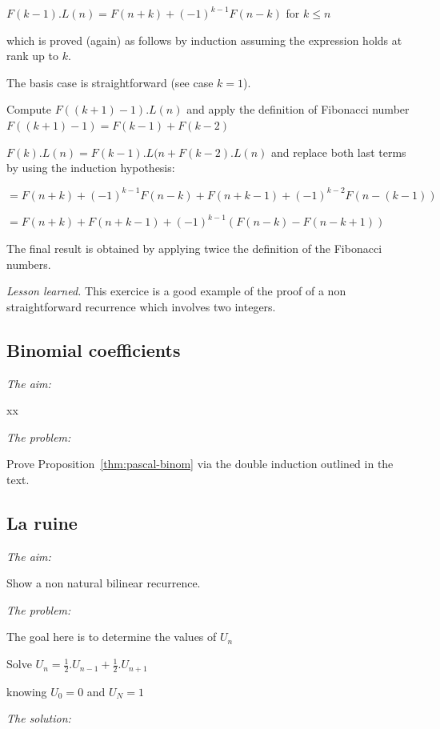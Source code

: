 \begin{itemize}
$F(k-1).L(n) = F(n+k) + (-1)^{k-1}F(n-k)$ for $k \leq n$
\medskip

which is proved (again) as follows by induction assuming the expression holds at rank up to $k$.

The basis case is straightforward (see case $k=1$).

Compute $F((k+1)-1).L(n)$ and apply the definition of Fibonacci number $F((k+1)-1) = F(k-1) + F(k-2)$

$F(k).L(n) = F(k-1).L(n + F(k-2).L(n)$ and replace both last terms by using the induction hypothesis:

$= F(n+k) + (-1)^{k-1}F(n-k) + F(n+k-1) + (-1)^{k-2}F(n-(k-1))$

$= F(n+k) +  F(n+k-1) + (-1)^{k-1}(F(n-k) - F(n-k+1))$

The final result is obtained by applying twice the definition of the Fibonacci numbers.
\medskip

\noindent \textit{Lesson learned.}
This exercice is a good example of the proof of a non straightforward recurrence which involves two integers.

\end{itemize}


\subsection{Binomial coefficients}

\noindent \textit{The aim:}

xx
\medskip

\noindent \textit{The problem:}

Prove Proposition~\ref{thm:pascal-binom} via the double induction
outlined in the text.



\subsection{La ruine}

\noindent \textit{The aim:}

Show a non natural bilinear recurrence.
\medskip

\noindent \textit{The problem:}

The goal here is to determine the values of  $U_n$

Solve $U_{n} = \frac{1}{2}.U_{n-1} + \frac{1}{2}.U_{n+1}$

knowing $U_0 = 0$ and $U_N = 1$
\medskip

\noindent \textit{The solution:}




